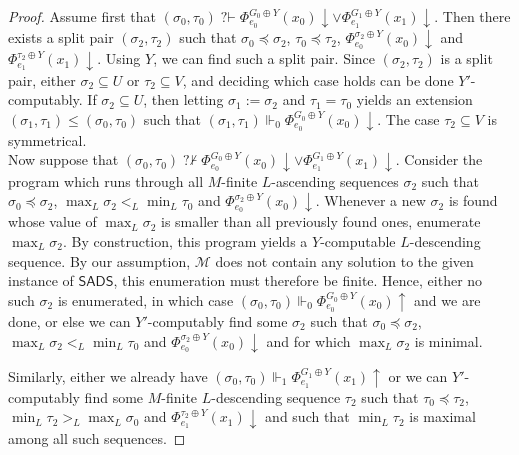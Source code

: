 \documentclass{article}
\numberwithin{theorem}{section}
\newcommand{\SADS}{\mathsf{SADS}}
\newcommand{\qvdash}{\operatorname{{?}{\vdash}}}
\newcommand{\nqvdash}{\operatorname{{?}{\nvdash}}}
\newcommand{\M}{\mathcal{M}}
\begin{document}
\begin{proof}
Assume first that $(\sigma_0, \tau_0) \qvdash \Phi_{e_0}^{G_0 \oplus Y}(x_0) \downarrow \vee \Phi_{e_1}^{G_1 \oplus Y}(x_1) \downarrow$. Then there exists a split pair $(\sigma_2, \tau_2)$ such that $\sigma_0 \preceq \sigma_2$, $\tau_0 \preceq \tau_2$, $\Phi_{e_0}^{\sigma_2 \oplus Y}(x_0)\downarrow$ and $\Phi_{e_1}^{\tau_2 \oplus Y}(x_1)\downarrow$. Using $Y$, we can find such a split pair. Since $(\sigma_2, \tau_2)$ is a split pair, either $\sigma_2 \subseteq U$ or $\tau_2 \subseteq V$, and deciding which case holds can be done $Y'$-computably. If $\sigma_2 \subseteq U$, then letting $\sigma_1 := \sigma_2$ and $\tau_1 = \tau_0$ yields an extension $(\sigma_1, \tau_1) \leq (\sigma_0, \tau_0)$ such that $(\sigma_1, \tau_1) \Vdash_0 \Phi_{e_0}^{G_0 \oplus Y}(x_0) \downarrow$. The case $\tau_2 \subseteq V$ is symmetrical.  \\

Now suppose that $(\sigma_ 0, \tau_ 0) \nqvdash \Phi_{e_0}^{G_0 \oplus Y}(x_0) \downarrow \vee \Phi_{e_1}^{G_1 \oplus Y}(x_1) \downarrow$. Consider the program which runs through all $M$-finite $L$-ascending sequences $\sigma_2$ such that $\sigma_ 0 \preceq \sigma_2$, $\max_L \sigma_2 <_L \min_L \tau_0$ and $\Phi_{e_0}^{\sigma_2 \oplus Y}(x_0) \downarrow$. Whenever a new $\sigma_2$ is found whose value of $\max_L \sigma_2$ is smaller than all previously found ones, enumerate $\max_L \sigma_2$. By construction, this program yields a $Y$-computable $L$-descending sequence. By our assumption, $\M$ does not contain any solution to the given instance of $\SADS$, this enumeration must therefore be finite. Hence, either no such $\sigma_2$ is enumerated, in which case $(\sigma_ 0, \tau_ 0) \Vdash_0 \Phi_{e_0}^{G_0 \oplus Y}(x_0) \uparrow$ and we are done, or else we can $Y'$-computably find some $\sigma_2$ such that $\sigma_0 \preceq \sigma_2$, $\max_L \sigma_2 <_L \min_L \tau_0$ and $\Phi_{e_0}^{\sigma_2 \oplus Y}(x_0) \downarrow$ and for which $\max_L \sigma_2$ is minimal. 

Similarly, either we already have $(\sigma_ 0, \tau_ 0) \Vdash_1 \Phi_{e_1}^{G_1 \oplus Y}(x_1) \uparrow$ or we can $Y'$-computably find some $M$-finite $L$-descending sequence $\tau_2$ such that $\tau_0 \preceq \tau_2$, $\min_L \tau_2 >_L \max_L \sigma_0$ and $\Phi_{e_1}^{\tau_2 \oplus Y}(x_1) \downarrow$ and such that $\min_L \tau_2$ is maximal among all such sequences. 


\end{proof}
\end{document}
